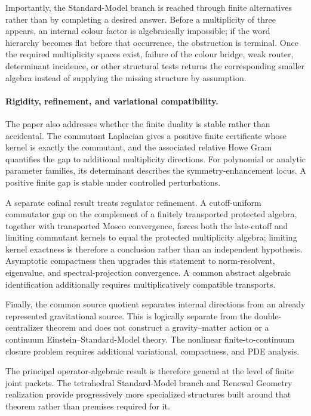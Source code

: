 \documentclass[11pt]{article}
\numberwithin{equation}{section}
\theoremstyle{definition}
\theoremstyle{remark}
\begin{document}
Importantly, the Standard-Model branch is reached through finite alternatives
rather than by completing a desired answer.  Before a multiplicity of three
appears, an internal colour factor is algebraically impossible; if the word
hierarchy becomes flat before that occurrence, the obstruction is terminal.
Once the required multiplicity spaces exist, failure of the colour bridge,
weak router, determinant incidence, or other structural tests returns the
corresponding smaller algebra instead of supplying the missing structure by
assumption.


\paragraph{Rigidity, refinement, and variational compatibility.}

The paper also addresses whether the finite duality is stable rather than
accidental.  The commutant Laplacian gives a positive finite certificate whose
kernel is exactly the commutant, and the associated relative Howe Gram
quantifies the gap to additional multiplicity directions.  For polynomial or
analytic parameter families, its determinant describes the
symmetry-enhancement locus.  A positive finite gap is stable under controlled
perturbations.

A separate cofinal result treats regulator refinement.  A cutoff-uniform
commutator gap on the complement of a finitely transported protected algebra,
together with transported Mosco convergence, forces both the late-cutoff and
limiting commutant kernels to equal the protected multiplicity algebra; limiting
kernel exactness is therefore a conclusion rather than an independent
hypothesis.  Asymptotic compactness then upgrades this statement to
norm-resolvent, eigenvalue, and spectral-projection convergence.  A common
abstract algebraic identification additionally requires multiplicatively
compatible transports.

Finally, the common source quotient separates internal directions from an
already represented gravitational source.  This is logically separate from
the double-centralizer theorem and does not construct a gravity--matter
action or a continuum Einstein--Standard-Model theory.  The nonlinear
finite-to-continuum closure problem requires additional variational,
compactness, and PDE analysis.

The principal operator-algebraic result is therefore general at the level of
finite joint packets.  The tetrahedral Standard-Model branch and Renewal
Geometry realization provide progressively more specialized structures built
around that theorem rather than premises required for it.
\end{document}
